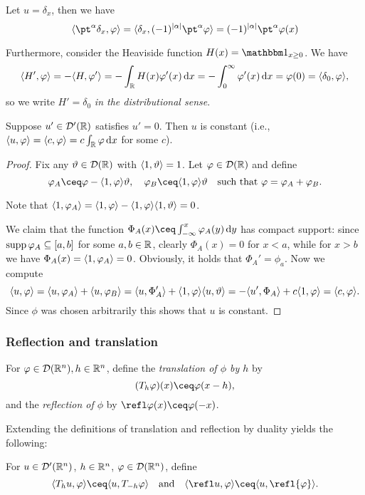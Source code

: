 \begin{example}
    Let $u = \delta_x$, then we have
    \[
    \ang{\pt^\alpha \delta_x, \phi} = \ang{\delta_x, (-1)^\abs{\alpha} \pt^\alpha\phi} = (-1)^\abs{\alpha} \pt^\alpha \phi(x)
    \]
    
    Furthermore, consider the Heaviside function $H(x) = \ind_{x \geq 0}$. We have
    \[
    \langle H', \varphi\rangle = - \langle H, \varphi'\rangle = -\int_\mathbb R H(x) \varphi'(x) \dd{x} = - \int_0^\infty \varphi'(x) \dd{x} = \varphi(0) = \langle\delta_0, \varphi\rangle, 
    \]
    so we write $H'= \delta_0$ \emph{in the distributional sense}. 
\end{example}

\begin{lemma}
    Suppose $u' \in \mathcal D'(\mathbb R)$ satisfies $u' = 0$. Then $u$ is constant (i.e., $\langle u, \varphi\rangle = \langle c, \varphi\rangle = c \int_\mathbb R \varphi \dd{x}$ for some $c$). 
\end{lemma}

\begin{proof}
    Fix  any $\vartheta \in \mathcal D(\mathbb R)$ with $\langle1, \vartheta\rangle = 1$. Let $\varphi \in \mathcal D(\mathbb R)$ and define
    \[
    \phi_A \ceq \phi - \ang{1, \phi}\theta, \quad \phi_B \ceq \ang{1, \phi}\theta \quad\text{such that }\phi = \phi_A + \phi_B.
    \]
    
    Note that $\langle1, \varphi_A\rangle = \langle1, \varphi\rangle - \langle1, \varphi\rangle\langle1, \vartheta\rangle = 0$.
    
    We claim that the function $\Phi_A(x) \ceq \int_{-\infty}^x \phi_A(y) \dd{y}$ has compact support: since $\operatorname{supp}\varphi_A \subseteq [a, b]$ for some $a, b \in \mathbb R$, clearly $\Phi_A(x) = 0$ for $x < a$, while for $x > b$ we have $\Phi_A(x) = \langle1, \varphi_A\rangle = 0$. 
    Obviously, it holds that $\Phi_A' = \phi_a$. Now we compute
    \[
    \langle u, \varphi\rangle = \langle u, \varphi_A\rangle + \langle u, \varphi_B\rangle = \langle u, \Phi_A'\rangle + \langle1, \varphi\rangle\langle u, \vartheta\rangle = - \langle u', \Phi_A\rangle + c \langle1, \varphi\rangle = \langle c, \varphi\rangle. 
    \]
    Since $\phi$ was chosen arbitrarily this shows that $u$ is constant. 
\end{proof}

\subsubsection{Reflection and translation} 
For $\varphi \in \mathcal D(\mathbb R^n), h \in \mathbb R^n$, define the \emph{translation of $\phi$ by $h$} by 
\[
(T_h\phi)(x) \ceq \phi(x - h),
\]
and the \emph{reflection of $\phi$} by $\refl\phi(x) \ceq \phi(-x)$. 

Extending the definitions of translation and reflection by duality yields the following:
\begin{definition}
    For $u \in \mathcal D'(\mathbb R^n)$, $h \in \mathbb R^n$, $\varphi \in \mathcal D(\mathbb R^n)$, define
    \[
    \ang{T_hu, \phi} \ceq \ang{u, T_{-h}\phi} \quad\text{and}\quad \ang{\refl u, \phi} \ceq \ang{u, \refl{\phi}}. 
    \]
\end{definition}

